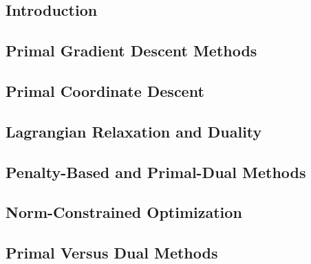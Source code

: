 \subsection{Introduction}


\subsection{Primal Gradient Descent Methods}


\subsection{Primal Coordinate Descent}


\subsection{Lagrangian Relaxation and Duality}


\subsection{Penalty-Based and Primal-Dual Methods}


\subsection{Norm-Constrained Optimization}


\subsection{Primal Versus Dual Methods}

